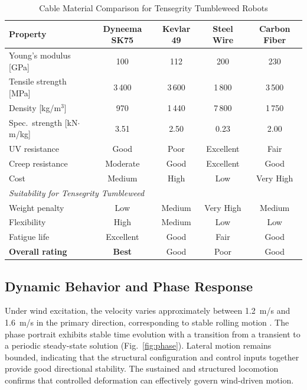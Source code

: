 \documentclass[conference]{IEEEtran}
\begin{document}
\begin{table}[htbp]
\centering
\caption{Cable Material Comparison for Tensegrity Tumbleweed Robots}
\label{tab:material_comparison}
\begin{tabular}{l c c c c}
\hline
\textbf{Property} & \textbf{Dyneema SK75} & \textbf{Kevlar 49} & \textbf{Steel Wire} & \textbf{Carbon Fiber} \\
\hline
Young's modulus [GPa]            & 100      & 112    & 200       & 230 \\
Tensile strength [MPa]           & 3\,400   & 3\,600 & 1\,800    & 3\,500 \\
Density [kg/m$^3$]               & 970      & 1\,440 & 7\,800    & 1\,750 \\
Spec.\ strength [kN$\cdot$m/kg] & 3.51     & 2.50   & 0.23      & 2.00 \\
UV resistance                    & Good     & Poor   & Excellent & Fair \\
Creep resistance                 & Moderate & Good   & Excellent & Good \\
Cost                             & Medium   & High   & Low       & Very High \\
\hline
\multicolumn{5}{l}{\textit{Suitability for Tensegrity Tumbleweed}} \\
\hline
Weight penalty                   & Low      & Medium & Very High & Medium \\
Flexibility                      & High     & Medium & Low       & Low \\
Fatigue life                     & Excellent & Good  & Fair      & Good \\
\textbf{Overall rating}          & \textbf{Best} & Good & Poor   & Good \\
\hline
\end{tabular}
\end{table}

\subsection{Dynamic Behavior and Phase Response}
Under wind excitation, the velocity varies approximately between 1.2~m/s and
1.6~m/s in the primary direction, corresponding to stable rolling motion
\cite{b17}. The phase portrait exhibits stable time evolution with a
transition from a transient to a periodic steady-state solution
\cite{b18} (Fig.~\ref{fig:phase}). Lateral motion remains bounded, indicating
that the structural configuration and control inputs together provide good
directional stability. The sustained and structured locomotion confirms that
controlled deformation can effectively govern wind-driven motion.
\end{document}
